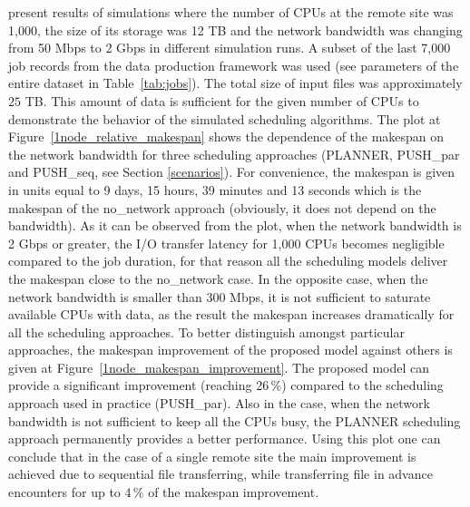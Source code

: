 \documentclass{svjour3}                     %
\begin{document}
present results of simulations where the number of CPUs at the remote site was 1,000, the size of its storage was 12 TB and the network bandwidth was changing from 50 Mbps to 2 Gbps in different simulation runs. A subset of the last 7,000 job records from the data production framework was used (see parameters of the entire dataset in Table~\ref{tab:jobs}). The total size of input files was approximately $25$ TB. This amount of data is sufficient for the given number of CPUs to demonstrate the behavior of the simulated scheduling algorithms. The plot at Figure~\ref{1node_relative_makespan} shows the dependence of the makespan on the network bandwidth for three scheduling approaches (PLANNER, PUSH\_par and PUSH\_seq, see Section \ref{scenarios}).  For convenience, the makespan is given in units equal to 9 days, 15 hours, 39 minutes and 13 seconds which is the makespan of the no\_network approach (obviously, it does not depend on the bandwidth). As it can be observed from the plot, when the network bandwidth is 2 Gbps or greater, the I/O transfer latency for 1,000 CPUs becomes negligible compared to the job duration, for that reason all the scheduling models deliver the makespan close to the no\_network case. In the opposite case, when the network bandwidth is smaller than 300 Mbps, it is not sufficient to saturate available CPUs with data, as the result the makespan increases dramatically for all the scheduling approaches. To better distinguish amongst particular approaches, the makespan improvement of the proposed model against others is given at Figure~\ref{1node_makespan_improvement}.  The proposed model can provide a significant improvement (reaching 26\,\%) compared to the scheduling approach used in practice (PUSH\_par). Also in the case, when the network bandwidth is not sufficient to keep all the CPUs busy, the PLANNER scheduling approach permanently provides a better performance. Using this plot one can conclude that in the case of a single remote site the main improvement is achieved due to sequential file transferring, while transferring file in advance encounters for up to 4\,\% of the makespan improvement.
\end{document}
